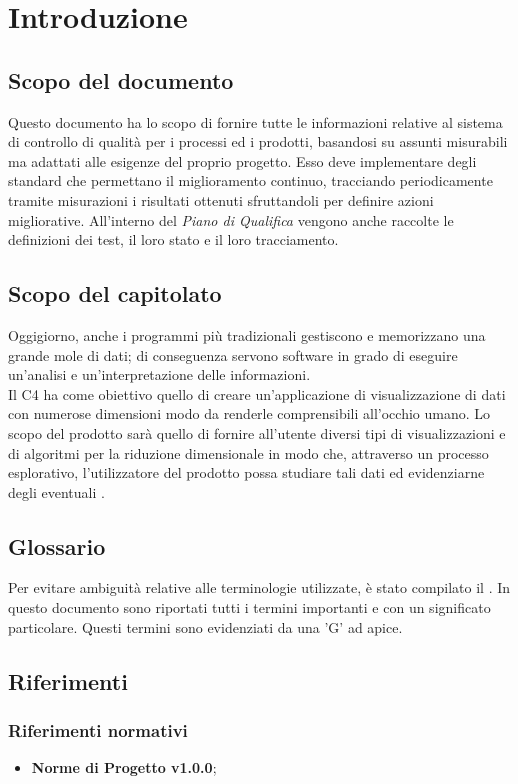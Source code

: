 \section{Introduzione}
\subsection{Scopo del documento}
Questo documento ha lo scopo di fornire tutte le informazioni relative al sistema di controllo di qualità per i processi ed i prodotti, basandosi su assunti misurabili ma adattati alle esigenze del proprio progetto.
Esso deve implementare degli standard che permettano il miglioramento continuo, tracciando periodicamente tramite misurazioni i risultati ottenuti sfruttandoli per definire azioni migliorative. All'interno del \textit{Piano di Qualifica} vengono anche raccolte le definizioni dei test, il loro stato e il loro tracciamento. 

\subsection{Scopo del capitolato}
Oggigiorno, anche i programmi più tradizionali gestiscono e memorizzano una grande mole di dati; di conseguenza servono software in grado di eseguire un'analisi e un'interpretazione delle informazioni.\\
Il  C4 ha come obiettivo quello di creare un'applicazione di visualizzazione di dati con numerose dimensioni modo da renderle comprensibili all'occhio umano.  Lo scopo del prodotto sarà quello di fornire all'utente diversi tipi di visualizzazioni e di algoritmi per la riduzione dimensionale in modo che, attraverso un processo esplorativo, l'utilizzatore del prodotto possa studiare tali dati ed evidenziarne degli eventuali . 

\subsection{Glossario}
Per evitare ambiguità relative alle terminologie utilizzate, è stato compilato il . In questo documento sono riportati tutti i termini importanti e con un significato particolare. Questi termini sono evidenziati da una 'G' ad apice.

\subsection{Riferimenti}
\subsubsection{Riferimenti normativi}
\begin{itemize}	
\item \textbf{Norme di Progetto v1.0.0};
	
\end{itemize}

